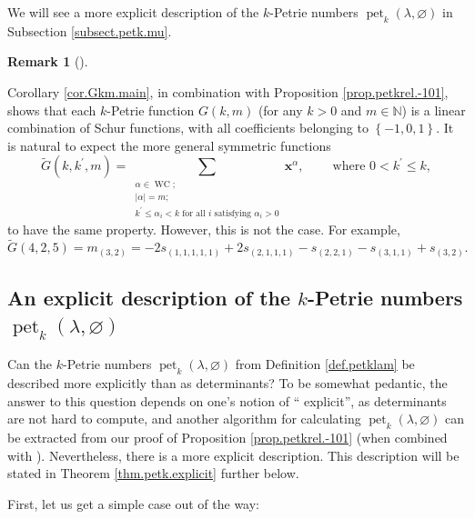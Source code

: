 \documentclass[numbers=enddot,12pt,final,onecolumn,notitlepage]{scrartcl}%
\theoremstyle{definition}
\newtheorem{remk}[theo]{Remark}
\newenvironment{remark}[1][]
{\begin{remk}[#1]\begin{leftbar}}
{\end{leftbar}\end{remk}}
\let\sumnonlimits\sum
\renewcommand{\sum}{\sumnonlimits\limits}
\begin{document}
We will see a more explicit description of the $k$-Petrie numbers
$\operatorname*{pet}\nolimits_{k}\left(  \lambda,\varnothing\right)  $ in
Subsection \ref{subsect.petk.mu}.

\begin{remark}
Corollary \ref{cor.Gkm.main}, in combination with Proposition
\ref{prop.petkrel.-101}, shows that each $k$-Petrie function $G\left(
k,m\right)  $ (for any $k>0$ and $m\in\mathbb{N}$) is a linear combination of
Schur functions, with all coefficients belonging to $\left\{  -1,0,1\right\}
$. It is natural to expect the more general symmetric functions
\[
\widetilde{G}\left(  k,k^{\prime},m\right)  =\sum_{\substack{\alpha
\in\operatorname*{WC};\\\left\vert \alpha\right\vert =m;\\k^{\prime}\leq
\alpha_{i}<k\text{ for all }i\text{ satisfying }\alpha_{i}>0}}\mathbf{x}%
^{\alpha},\ \ \ \ \ \ \ \ \ \ \text{where }0<k^{\prime}\leq k,
\]
to have the same property. However, this is not the case. For example,%
\[
\widetilde{G}\left(  4,2,5\right)  =m_{\left(  3,2\right)  }=-2s_{\left(
1,1,1,1,1\right)  }+2s_{\left(  2,1,1,1\right)  }-s_{\left(  2,2,1\right)
}-s_{\left(  3,1,1\right)  }+s_{\left(  3,2\right)  }.
\]

\end{remark}

\subsection{\label{subsect.petk.mu}An explicit description of the $k$-Petrie
numbers $\operatorname*{pet}\nolimits_{k}\left(  \lambda,\varnothing\right)
$}

Can the $k$-Petrie numbers $\operatorname*{pet}\nolimits_{k}\left(
\lambda,\varnothing\right)  $ from Definition \ref{def.petklam} be described
more explicitly than as determinants? To be somewhat pedantic, the answer to
this question depends on one's notion of \textquotedblleft
explicit\textquotedblright, as determinants are not hard to compute, and
another algorithm for calculating $\operatorname*{pet}\nolimits_{k}\left(
\lambda,\varnothing\right)  $ can be extracted from our proof of Proposition
\ref{prop.petkrel.-101} (when combined with \cite[proof of Theorem
1]{GorWil74}). Nevertheless, there is a more explicit description. This
description will be stated in Theorem \ref{thm.petk.explicit} further below.

First, let us get a simple case out of the way:
\end{document}
